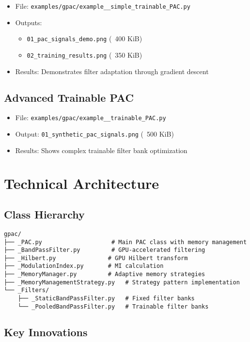 \documentclass[11pt,a4paper]{article}
\begin{document}
\begin{itemize}
\item File: \texttt{examples/gpac/example\_\_simple\_trainable\_PAC.py}
\item Outputs:
  \begin{itemize}
  \item \texttt{01\_pac\_signals\_demo.png} (~400 KiB)
  \item \texttt{02\_training\_results.png} (~350 KiB)
  \end{itemize}
\item Results: Demonstrates filter adaptation through gradient descent
\end{itemize}

\subsection{Advanced Trainable PAC}

\begin{itemize}
\item File: \texttt{examples/gpac/example\_\_trainable\_PAC.py}
\item Output: \texttt{01\_synthetic\_pac\_signals.png} (~500 KiB)
\item Results: Shows complex trainable filter bank optimization
\end{itemize}

\section{Technical Architecture}

\subsection{Class Hierarchy}

\begin{verbatim}
gpac/
├── _PAC.py                    # Main PAC class with memory management
├── _BandPassFilter.py         # GPU-accelerated filtering
├── _Hilbert.py               # GPU Hilbert transform
├── _ModulationIndex.py       # MI calculation
├── _MemoryManager.py         # Adaptive memory strategies
├── _MemoryManagementStrategy.py   # Strategy pattern implementation
└── _Filters/
    ├── _StaticBandPassFilter.py   # Fixed filter banks
    └── _PooledBandPassFilter.py   # Trainable filter banks
\end{verbatim}

\subsection{Key Innovations}
\end{document}

